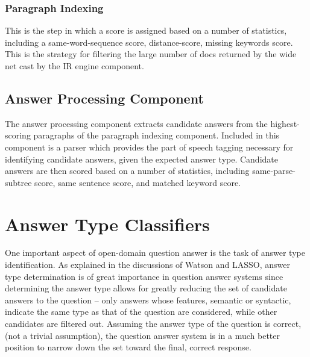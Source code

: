 \subsubsection{Paragraph Indexing}

This is the step in which a score is assigned based on a number of statistics, including a same-word-sequence score, distance-score, missing keywords score.  This is the strategy for filtering the large number of docs returned by the wide net cast by the IR engine component.

\subsection{Answer Processing Component}

The answer processing component extracts candidate answers from the highest-scoring paragraphs of the paragraph indexing component.  Included in this component is a parser which provides the part of speech tagging necessary for identifying candidate answers, given the expected answer type.  Candidate answers are then scored based on a number of statistics, including same-parse-subtree score, same sentence score, and matched keyword score.


\section{Answer Type Classifiers}

One important aspect of open-domain question answer is the task of answer type identification.  As explained in the discussions of Watson and LASSO, answer type determination is of great importance in question answer systems since determining the answer type allows for greatly reducing the set of candidate answers to the question – only answers whose features, semantic or syntactic, indicate the same type as that of the question are considered, while other candidates are filtered out.  Assuming the answer type of the question is correct, (not a trivial assumption), the question answer system is in a much better position to narrow down the set toward the final, correct response.

